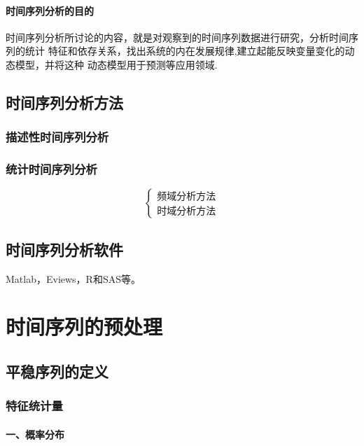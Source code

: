 \documentclass[12pt, a4paper, oneside]{ctexbook}
\begin{document}
\subsubsection*{时间序列分析的目的}
时间序列分析所讨论的内容，就是对观察到的时间序列数据进行研究，分析时间序列的统计
特征和依存关系，找出系统的内在发展规律,建立起能反映变量变化的动态模型，并将这种
动态模型用于预测等应用领域.

\section{时间序列分析方法}
\subsection{描述性时间序列分析}

\subsection{统计时间序列分析}
\begin{equation*}
    \left\{ \begin{array}{l}
        \text{频域分析方法} \\
        \text{时域分析方法}
    \end{array} \right.
\end{equation*}

\section{时间序列分析软件}
Matlab，Eviews，R和SAS等。

\chapter{时间序列的预处理}
\section{平稳序列的定义}
\subsection{特征统计量}
\subsubsection{一、概率分布}
\end{document}
